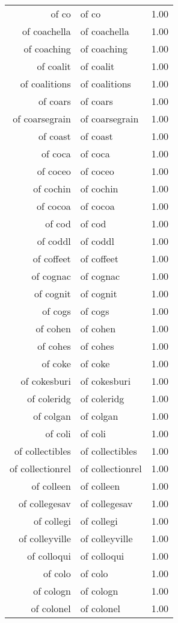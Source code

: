 \begin{table}[ht]
\begin{tabular}{rlr}
  of co & of co & 1.00 \\ 
  of coachella & of coachella & 1.00 \\ 
  of coaching & of coaching & 1.00 \\ 
  of coalit & of coalit & 1.00 \\ 
  of coalitions & of coalitions & 1.00 \\ 
  of coars & of coars & 1.00 \\ 
  of coarsegrain & of coarsegrain & 1.00 \\ 
  of coast & of coast & 1.00 \\ 
  of coca & of coca & 1.00 \\ 
  of coceo & of coceo & 1.00 \\ 
  of cochin & of cochin & 1.00 \\ 
  of cocoa & of cocoa & 1.00 \\ 
  of cod & of cod & 1.00 \\ 
  of coddl & of coddl & 1.00 \\ 
  of coffeet & of coffeet & 1.00 \\ 
  of cognac & of cognac & 1.00 \\ 
  of cognit & of cognit & 1.00 \\ 
  of cogs & of cogs & 1.00 \\ 
  of cohen & of cohen & 1.00 \\ 
  of cohes & of cohes & 1.00 \\ 
  of coke & of coke & 1.00 \\ 
  of cokesburi & of cokesburi & 1.00 \\ 
  of coleridg & of coleridg & 1.00 \\ 
  of colgan & of colgan & 1.00 \\ 
  of coli & of coli & 1.00 \\ 
  of collectibles & of collectibles & 1.00 \\ 
  of collectionrel & of collectionrel & 1.00 \\ 
  of colleen & of colleen & 1.00 \\ 
  of collegesav & of collegesav & 1.00 \\ 
  of collegi & of collegi & 1.00 \\ 
  of colleyville & of colleyville & 1.00 \\ 
  of colloqui & of colloqui & 1.00 \\ 
  of colo & of colo & 1.00 \\ 
  of cologn & of cologn & 1.00 \\ 
  of colonel & of colonel & 1.00 \\ 

\end{tabular}
\end{table}
